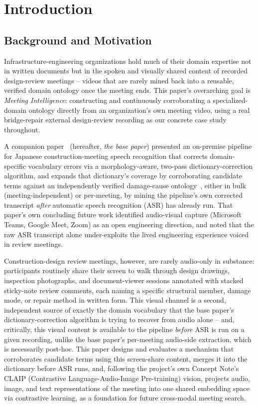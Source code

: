 ﻿\documentclass[twocolumn]{article}
\begin{document}
\section{Introduction}
\label{sec:intro}

\subsection{Background and Motivation}

Infrastructure-engineering organizations hold much of their domain expertise not in written
documents but in the spoken and visually shared content of recorded design-review meetings --
videos that are rarely mined back into a reusable, verified domain ontology once the meeting ends.
This paper's overarching goal is \emph{Meeting Intelligence}: constructing and continuously
corroborating a specialized-domain ontology directly from an organization's own meeting video, using
a real bridge-repair external design-review recording as our concrete case study throughout.

A companion paper~\cite{yasuno2026meetingasr} (hereafter, \emph{the base paper}) presented an
on-premise pipeline for Japanese construction-meeting speech recognition that corrects
domain-specific vocabulary errors via a morphology-aware, two-pass dictionary-correction algorithm,
and expands that dictionary's coverage by corroborating candidate terms against an independently
verified damage-cause ontology~\cite{yasuno2026ontology}, either in bulk (meeting-independent) or
per-meeting, by mining the pipeline's own corrected transcript \emph{after} automatic speech
recognition (ASR) has already run. That paper's own concluding future work identified audio-visual
capture (Microsoft Teams, Google Meet, Zoom) as an open engineering direction, and noted that the
raw ASR transcript alone under-exploits the lived engineering experience voiced in review meetings.

Construction-design review meetings, however, are rarely audio-only in substance: participants
routinely share their screen to walk through design drawings, inspection photographs, and
document-viewer sessions annotated with stacked sticky-note review comments, each naming a specific
structural member, damage mode, or repair method in written form. This visual channel is a second,
independent source of exactly the domain vocabulary that the base paper's dictionary-correction
algorithm is trying to recover from audio alone -- and, critically, this visual content is available
to the pipeline \emph{before} ASR is run on a given recording, unlike the base paper's per-meeting
audio-side extraction, which is necessarily post-hoc. This paper designs and evaluates a
mechanism that corroborates candidate terms using this screen-share content, merges it into the
dictionary before ASR runs, and, following the project's own Concept Note's CLAIP
(Contrastive Language-Audio-Image Pre-training) vision, projects audio, image, and text
representations of the meeting into one shared embedding space via contrastive learning, as a
foundation for future cross-modal meeting search.
\end{document}
